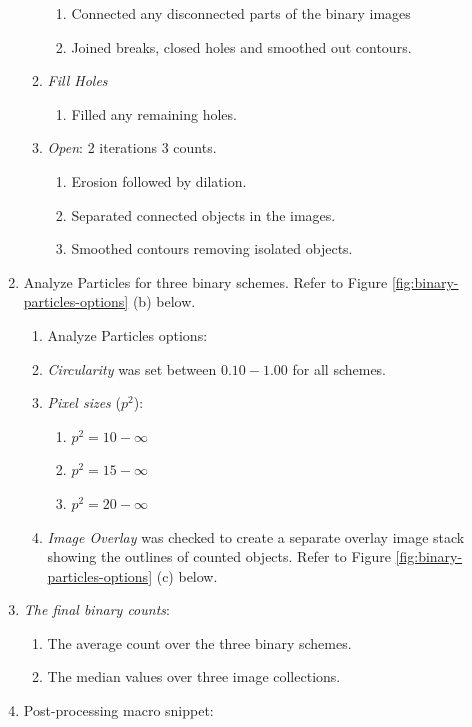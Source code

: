 \begin{enumerate}
\begin{enumerate}
\begin{enumerate}
			\item Connected any disconnected parts of the binary images
			\item Joined breaks, closed holes and smoothed out contours.
			\end{enumerate}
		\item \emph{Fill Holes}
			\begin{enumerate}
			\item Filled any remaining holes.
			\end{enumerate}
		\item \emph{Open}: 2 iterations 3 counts. 
			\begin{enumerate}
			\item Erosion followed by dilation.
			\item Separated connected objects in the images.
			\item Smoothed contours removing isolated objects. 
			\end{enumerate}
	\end{enumerate}
\item  Analyze Particles for three binary schemes. Refer to Figure  \ref{fig:binary-particles-options} (b) below. 
	\begin{enumerate}
	\item Analyze Particles options:
	\item \emph{Circularity} was set between $0.10-1.00$ for all schemes.
	\item \emph{Pixel sizes} ($ p^2$):
		\begin{enumerate}
		\item $ p^2 = 10-\infty$
		\item $ p^2 = 15-\infty$
		\item $ p^2 = 20-\infty$
		\end{enumerate}
	\item \emph{Image Overlay} was checked to create a separate overlay image stack showing the outlines of counted objects. Refer to Figure  \ref{fig:binary-particles-options} (c) below. 
	\end{enumerate}
\item \emph{The final binary counts}:
	\begin{enumerate}
	\item The average count over the three binary schemes.
	\item The median values over three image collections.
	\end{enumerate}
\item Post-processing macro snippet:
\begin{lstlisting}[language=java, caption=Post-processing snippet., label=cd:pp]

\end{lstlisting}
\end{enumerate}
